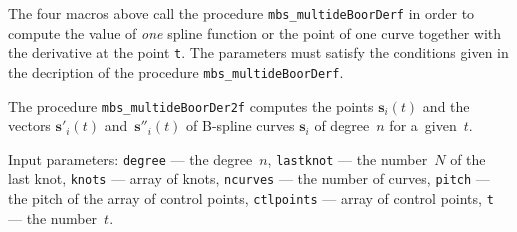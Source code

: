 \vspace{\bigskipamount}
\begin{sloppypar}
The four macros above call the procedure \texttt{mbs\_multideBoorDerf} in order to
compute the value of \emph{one} spline function or the point of one curve
together with the derivative at the point \texttt{t}. The parameters must
satisfy the conditions given in the decription of the procedure
\texttt{mbs\_multideBoorDerf}.
\end{sloppypar}

\vspace{\bigskipamount}
\begin{sloppypar}
The procedure \texttt{mbs\_multideBoorDer2f} computes the points
$\bm{s}_i(t)$ and the vectors $\bm{s}'_i(t)$ and~$\bm{s}''_i(t)$
of B-spline curves $\bm{s}_i$ of degree~$n$ for a~given~$t$.
\end{sloppypar}

Input parameters: \texttt{degree} --- the degree~$n$,
\texttt{lastknot} --- the number~$N$ of the last knot,
\texttt{knots} --- array of knots, \texttt{ncurves}
--- the number of curves, \texttt{pitch} --- the pitch of the array
of control points, \texttt{ctlpoints} --- array of control points,
\texttt{t} --- the number~$t$.

